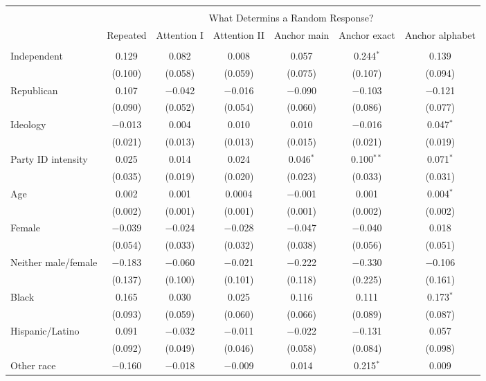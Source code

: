 
\begin{tabular}{@{\extracolsep{5pt}}lcccccc} 
\\[-1.8ex]\hline 
\hline \\[-1.8ex] 
 & \multicolumn{6}{c}{What Determins a Random Response?} \\ 
\cline{2-7} 
 & Repeated & Attention I & Attention II & Anchor main & Anchor exact & Anchor alphabet \\ 
\hline \\[-1.8ex] 
 Independent & 0.129 & 0.082 & 0.008 & 0.057 & 0.244$^{*}$ & 0.139 \\ 
  & (0.100) & (0.058) & (0.059) & (0.075) & (0.107) & (0.094) \\ 
  Republican & 0.107 & $-$0.042 & $-$0.016 & $-$0.090 & $-$0.103 & $-$0.121 \\ 
  & (0.090) & (0.052) & (0.054) & (0.060) & (0.086) & (0.077) \\ 
  Ideology & $-$0.013 & 0.004 & 0.010 & 0.010 & $-$0.016 & 0.047$^{*}$ \\ 
  & (0.021) & (0.013) & (0.013) & (0.015) & (0.021) & (0.019) \\ 
  Party ID intensity & 0.025 & 0.014 & 0.024 & 0.046$^{*}$ & 0.100$^{**}$ & 0.071$^{*}$ \\ 
  & (0.035) & (0.019) & (0.020) & (0.023) & (0.033) & (0.031) \\ 
  Age & 0.002 & 0.001 & 0.0004 & $-$0.001 & 0.001 & 0.004$^{*}$ \\ 
  & (0.002) & (0.001) & (0.001) & (0.001) & (0.002) & (0.002) \\ 
  Female & $-$0.039 & $-$0.024 & $-$0.028 & $-$0.047 & $-$0.040 & 0.018 \\ 
  & (0.054) & (0.033) & (0.032) & (0.038) & (0.056) & (0.051) \\ 
  Neither male/female & $-$0.183 & $-$0.060 & $-$0.021 & $-$0.222 & $-$0.330 & $-$0.106 \\ 
  & (0.137) & (0.100) & (0.101) & (0.118) & (0.225) & (0.161) \\ 
  Black & 0.165 & 0.030 & 0.025 & 0.116 & 0.111 & 0.173$^{*}$ \\ 
  & (0.093) & (0.059) & (0.060) & (0.066) & (0.089) & (0.087) \\ 
  Hispanic/Latino & 0.091 & $-$0.032 & $-$0.011 & $-$0.022 & $-$0.131 & 0.057 \\ 
  & (0.092) & (0.049) & (0.046) & (0.058) & (0.084) & (0.098) \\ 
  Other race & $-$0.160 & $-$0.018 & $-$0.009 & 0.014 & 0.215$^{*}$ & 0.009 \\ 

\end{tabular}
